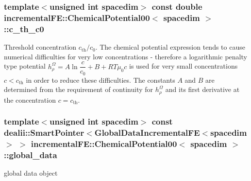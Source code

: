 \subsubsection[{\texorpdfstring{c\+\_\+th\+\_\+c0}{c_th_c0}}]{\setlength{\rightskip}{0pt plus 5cm}template$<$unsigned int spacedim$>$ const double {\bf incremental\+F\+E\+::\+Chemical\+Potential00}$<$ spacedim $>$\+::c\+\_\+th\+\_\+c0\hspace{0.3cm}{\ttfamily [private]}}\hypertarget{classincremental_f_e_1_1_chemical_potential00_aa8dbd044f314f694e09c7a1214e4a1a9}{}\label{classincremental_f_e_1_1_chemical_potential00_aa8dbd044f314f694e09c7a1214e4a1a9}
Threshold concentration $c_\mathrm{th}/c_0$. The chemical potential expression tends to cause numerical difficulties for very low concentrations -\/ therefore a logarithmic penalty type potential $h^\Omega_\rho = A \ln\dfrac{c}{c_0} + B + RT \mu_0 c$ is used for very small concentrations $c<c_\mathrm{th}$ in order to reduce these difficulties. The constants $A$ and $B$ are determined from the requirement of continuity for $h^\Omega_\rho$ and its first derivative at the concentration $c=c_\mathrm{th}$. 
\subsubsection[{\texorpdfstring{global\+\_\+data}{global_data}}]{\setlength{\rightskip}{0pt plus 5cm}template$<$unsigned int spacedim$>$ const dealii\+::\+Smart\+Pointer$<${\bf Global\+Data\+Incremental\+FE}$<$spacedim$>$ $>$ {\bf incremental\+F\+E\+::\+Chemical\+Potential00}$<$ spacedim $>$\+::global\+\_\+data\hspace{0.3cm}{\ttfamily [private]}}\hypertarget{classincremental_f_e_1_1_chemical_potential00_a1dcd80b6f6f2906c38ad490d519e3123}{}\label{classincremental_f_e_1_1_chemical_potential00_a1dcd80b6f6f2906c38ad490d519e3123}
global data object 
